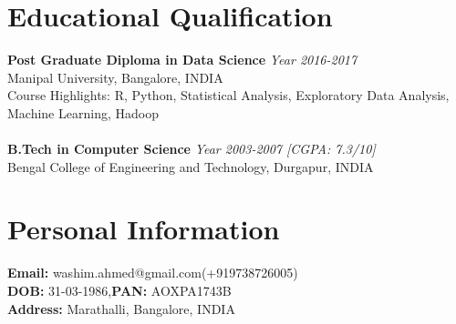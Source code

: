 \documentclass{article}
\begin{document}
\section{Educational Qualification}
\textbf{Post Graduate Diploma in Data Science} \hfill \textit{Year 2016-2017}\\
Manipal University, \textnormal{Bangalore, INDIA}\\
Course Highlights: R, Python, Statistical Analysis, Exploratory Data Analysis, Machine Learning, Hadoop\\~\\
\textbf{B.Tech in Computer Science} \hfill \textit{Year 2003-2007 [CGPA: 7.3/10]}\\
Bengal College of Engineering and Technology, \textnormal{Durgapur, INDIA}

\thispagestyle{empty}
\section{Personal Information}
\textbf{Email:} washim.ahmed@gmail.com(+919738726005)\\
\textbf{DOB:} 31-03-1986,\textbf{PAN:} AOXPA1743B\\
\textbf{Address:} Marathalli, Bangalore, INDIA
\end{document}
